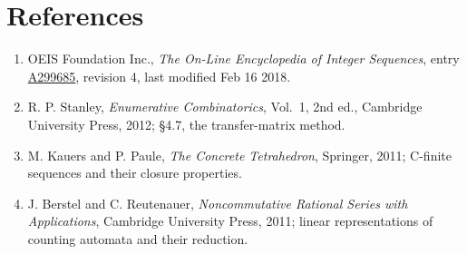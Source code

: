 \documentclass[11pt]{article}
\theoremstyle{definition}
\begin{document}
\section{References}

\begin{enumerate}

\item OEIS Foundation Inc., \emph{The On-Line Encyclopedia of Integer Sequences}, entry \href{https://oeis.org/A299685}{A299685}, revision 4, last modified Feb 16 2018.

\item R. P. Stanley, \emph{Enumerative Combinatorics}, Vol.~1, 2nd ed., Cambridge University Press, 2012; \S4.7, the transfer-matrix method.

\item M. Kauers and P. Paule, \emph{The Concrete Tetrahedron}, Springer, 2011; C-finite sequences and their closure properties.

\item J. Berstel and C. Reutenauer, \emph{Noncommutative Rational Series with Applications}, Cambridge University Press, 2011; linear representations of counting automata and their reduction.

\end{enumerate}
\end{document}
